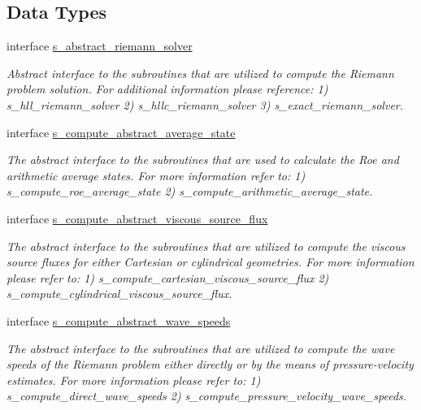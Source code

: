 \subsection*{Data Types}
\begin{DoxyCompactItemize}
\item 
interface \hyperlink{interfacem__riemann__solvers_1_1s__abstract__riemann__solver}{s\+\_\+abstract\+\_\+riemann\+\_\+solver}
\begin{DoxyCompactList}\small\item\em Abstract interface to the subroutines that are utilized to compute the Riemann problem solution. For additional information please reference\+: 1) s\+\_\+hll\+\_\+riemann\+\_\+solver 2) s\+\_\+hllc\+\_\+riemann\+\_\+solver 3) s\+\_\+exact\+\_\+riemann\+\_\+solver. \end{DoxyCompactList}\item 
interface \hyperlink{interfacem__riemann__solvers_1_1s__compute__abstract__average__state}{s\+\_\+compute\+\_\+abstract\+\_\+average\+\_\+state}
\begin{DoxyCompactList}\small\item\em The abstract interface to the subroutines that are used to calculate the Roe and arithmetic average states. For more information refer to\+: 1) s\+\_\+compute\+\_\+roe\+\_\+average\+\_\+state 2) s\+\_\+compute\+\_\+arithmetic\+\_\+average\+\_\+state. \end{DoxyCompactList}\item 
interface \hyperlink{interfacem__riemann__solvers_1_1s__compute__abstract__viscous__source__flux}{s\+\_\+compute\+\_\+abstract\+\_\+viscous\+\_\+source\+\_\+flux}
\begin{DoxyCompactList}\small\item\em The abstract interface to the subroutines that are utilized to compute the viscous source fluxes for either Cartesian or cylindrical geometries. For more information please refer to\+: 1) s\+\_\+compute\+\_\+cartesian\+\_\+viscous\+\_\+source\+\_\+flux 2) s\+\_\+compute\+\_\+cylindrical\+\_\+viscous\+\_\+source\+\_\+flux. \end{DoxyCompactList}\item 
interface \hyperlink{interfacem__riemann__solvers_1_1s__compute__abstract__wave__speeds}{s\+\_\+compute\+\_\+abstract\+\_\+wave\+\_\+speeds}
\begin{DoxyCompactList}\small\item\em The abstract interface to the subroutines that are utilized to compute the wave speeds of the Riemann problem either directly or by the means of pressure-\/velocity estimates. For more information please refer to\+: 1) s\+\_\+compute\+\_\+direct\+\_\+wave\+\_\+speeds 2) s\+\_\+compute\+\_\+pressure\+\_\+velocity\+\_\+wave\+\_\+speeds. \end{DoxyCompactList}\end{DoxyCompactItemize}

